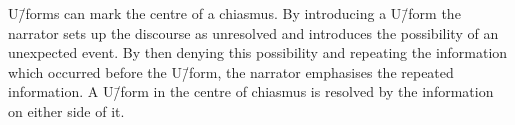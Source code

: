 U\=/forms can mark the centre of a chiasmus.
By introducing a U\=/form the narrator
sets up the discourse as unresolved and introduces
the possibility of an unexpected event.
By then denying this possibility and
repeating the information which occurred before the U\=/form,
the narrator emphasises the repeated information.
A U\=/form in the centre of chiasmus is resolved by
the information on either side of it.
